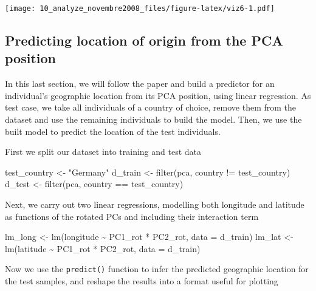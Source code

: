 \documentclass[
]{article}
\newenvironment{Shaded}{\begin{snugshade}}{\end{snugshade}}
\newcommand{\AttributeTok}[1]{\textcolor[rgb]{0.77,0.63,0.00}{#1}}
\newcommand{\FunctionTok}[1]{\textcolor[rgb]{0.00,0.00,0.00}{#1}}
\newcommand{\NormalTok}[1]{#1}
\newcommand{\OtherTok}[1]{\textcolor[rgb]{0.56,0.35,0.01}{#1}}
\newcommand{\SpecialCharTok}[1]{\textcolor[rgb]{0.00,0.00,0.00}{#1}}
\newcommand{\StringTok}[1]{\textcolor[rgb]{0.31,0.60,0.02}{#1}}
\begin{document}
\texttt{[image: 10\_analyze\_novembre2008\_files/figure-latex/viz6-1.pdf]}

\hypertarget{predicting-location-of-origin-from-the-pca-position}{%
\subsection{Predicting location of origin from the PCA
position}\label{predicting-location-of-origin-from-the-pca-position}}

In this last section, we will follow the paper and build a predictor for
an individual's geographic location from its PCA position, using linear
regression. As test case, we take all individuals of a country of
choice, remove them from the dataset and use the remaining individuals
to build the model. Then, we use the built model to predict the location
of the test individuals.

First we split our dataset into training and test data

\begin{Shaded}
\begin{Highlighting}[]
\NormalTok{test\_country }\OtherTok{\textless{}{-}} \StringTok{"Germany"}
\NormalTok{d\_train }\OtherTok{\textless{}{-}} \FunctionTok{filter}\NormalTok{(pca, country }\SpecialCharTok{!=}\NormalTok{ test\_country)}
\NormalTok{d\_test }\OtherTok{\textless{}{-}} \FunctionTok{filter}\NormalTok{(pca, country }\SpecialCharTok{==}\NormalTok{ test\_country)}
\end{Highlighting}
\end{Shaded}

Next, we carry out two linear regressions, modelling both longitude and
latitude as functions of the rotated PCs and including their interaction
term

\begin{Shaded}
\begin{Highlighting}[]
\NormalTok{lm\_long }\OtherTok{\textless{}{-}} \FunctionTok{lm}\NormalTok{(longitude }\SpecialCharTok{\textasciitilde{}}\NormalTok{ PC1\_rot }\SpecialCharTok{*}\NormalTok{ PC2\_rot, }\AttributeTok{data =}\NormalTok{ d\_train)}
\NormalTok{lm\_lat }\OtherTok{\textless{}{-}} \FunctionTok{lm}\NormalTok{(latitude }\SpecialCharTok{\textasciitilde{}}\NormalTok{ PC1\_rot }\SpecialCharTok{*}\NormalTok{ PC2\_rot, }\AttributeTok{data =}\NormalTok{ d\_train)}
\end{Highlighting}
\end{Shaded}

Now we use the \texttt{predict()} function to infer the predicted
geographic location for the test samples, and reshape the results into a
format useful for plotting
\end{document}
